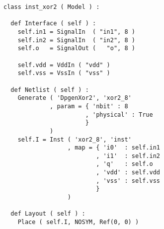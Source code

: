 \begin{itemize}
\begin{verbatim}
class inst_xor2 ( Model ) :

  def Interface ( self ) :
    self.in1 = SignalIn  ( "in1", 8 )
    self.in2 = SignalIn  ( "in2", 8 )
    self.o   = SignalOut (   "o", 8 )

    self.vdd = VddIn ( "vdd" )
    self.vss = VssIn ( "vss" )
    
  def Netlist ( self ) :
    Generate ( 'DpgenXor2', 'xor2_8'
             , param = { 'nbit' : 8 
                       , 'physical' : True
                       }
             )
    self.I = Inst ( 'xor2_8', 'inst'
                  , map = { 'i0'  : self.in1
                          , 'i1'  : self.in2
                          , 'q'   : self.o
                          , 'vdd' : self.vdd
                          , 'vss' : self.vss
                          }
                  )
    
  def Layout ( self ) :
    Place ( self.I, NOSYM, Ref(0, 0) )
\end{verbatim}
\end{itemize}
